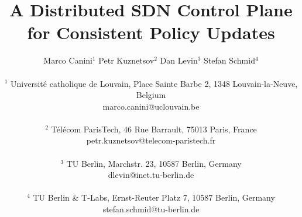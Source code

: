 \documentclass[11pt,pdftex,letter]{article}
\def\SAVESPACE{1}
\begin{document}
\sloppy




\title{A Distributed SDN Control Plane for Consistent Policy Updates}



\author{
	Marco Canini$^{1}$ \quad Petr Kuznetsov$^{2}$ \quad Dan
        Levin$^{3}$ \quad Stefan Schmid$^{4}$\\
\\
        $^{1}$ Universit\'{e} catholique de Louvain, Place Sainte Barbe 2, 1348 Louvain-la-Neuve, Belgium\\
        marco.canini@uclouvain.be\\
\\
        $^{2}$ T\'el\'ecom ParisTech, 46 Rue Barrault, 75013 Paris, France\\
        petr.kuznetsov@telecom-paristech.fr\\
\\
        $^{3}$ TU Berlin, Marchstr. 23, 10587 Berlin, Germany\\
        dlevin@inet.tu-berlin.de\\
\\
        $^{4}$ TU Berlin \& T-Labs, Ernst-Reuter Platz 7, 10587 Berlin, Germany\\
	    stefan.schmid@tu-berlin.de}


\date{}


\maketitle


\thispagestyle{empty}


\end{document}
